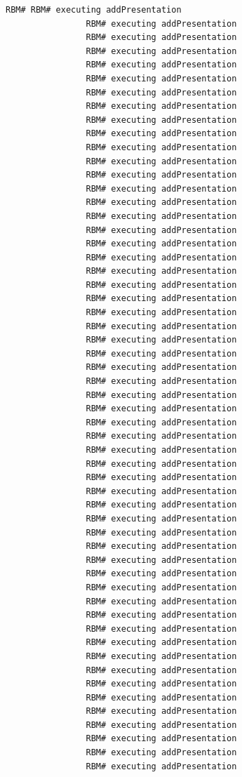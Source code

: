 \documentclass{article}
\begin{document}
\begin{Verbatim}[gobble=8]
                RBM# RBM# executing addPresentation
                RBM# executing addPresentation
                RBM# executing addPresentation
                RBM# executing addPresentation
                RBM# executing addPresentation
                RBM# executing addPresentation
                RBM# executing addPresentation
                RBM# executing addPresentation
                RBM# executing addPresentation
                RBM# executing addPresentation
                RBM# executing addPresentation
                RBM# executing addPresentation
                RBM# executing addPresentation
                RBM# executing addPresentation
                RBM# executing addPresentation
                RBM# executing addPresentation
                RBM# executing addPresentation
                RBM# executing addPresentation
                RBM# executing addPresentation
                RBM# executing addPresentation
                RBM# executing addPresentation
                RBM# executing addPresentation
                RBM# executing addPresentation
                RBM# executing addPresentation
                RBM# executing addPresentation
                RBM# executing addPresentation
                RBM# executing addPresentation
                RBM# executing addPresentation
                RBM# executing addPresentation
                RBM# executing addPresentation
                RBM# executing addPresentation
                RBM# executing addPresentation
                RBM# executing addPresentation
                RBM# executing addPresentation
                RBM# executing addPresentation
                RBM# executing addPresentation
                RBM# executing addPresentation
                RBM# executing addPresentation
                RBM# executing addPresentation
                RBM# executing addPresentation
                RBM# executing addPresentation
                RBM# executing addPresentation
                RBM# executing addPresentation
                RBM# executing addPresentation
                RBM# executing addPresentation
                RBM# executing addPresentation
                RBM# executing addPresentation
                RBM# executing addPresentation
                RBM# executing addPresentation
                RBM# executing addPresentation
                RBM# executing addPresentation
                RBM# executing addPresentation
                RBM# executing addPresentation
                RBM# executing addPresentation
                RBM# executing addPresentation
                RBM# executing addPresentation

\end{Verbatim}
\end{document}
